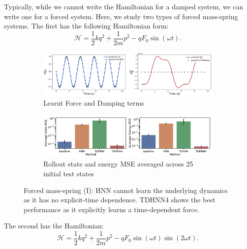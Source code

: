 \documentclass{article}
\begin{document}
Typically, while we cannot write the Hamiltonian for a damped system, we can write one for a forced system. Here, we study two types of forced mass-spring systems. The first has the following Hamiltonian form:
\begin{equation}
\mathcal{H} = \frac{1}{2}kq^2 + \frac{1}{2m}p^2 - qF_0\sin(\omega t).
\end{equation}
\begin{figure}[h!]
\centering
\captionsetup{justification=centering}
	\begin{subfigure}[b]{0.48\textwidth}
		\centering
		\includegraphics[width=\textwidth]{figures/figures/forced_mass_spring/1/forced_mass_spring_dpdt_new_0.pdf}
		\caption{Learnt Force and Damping terms}
	\end{subfigure}
	\begin{subfigure}[b]{0.48\textwidth}
	    \centering
		\includegraphics[width=\textwidth]{figures/figures/forced_mass_spring/1/forced_mass_spring_errors_0.pdf}
		\caption{Rollout state and energy MSE averaged across 25 initial test states}
	\end{subfigure}
\caption{Forced mass-spring (I): HNN cannot learn the underlying dynamics as it has no explicit-time dependence. TDHNN4 shows the best performance as it explicitly learns a time-dependent force.}
\label{fig.fmspring1}
\end{figure}
The second has the Hamiltonian:
\begin{equation}
\mathcal{H} = \frac{1}{2}kq^2 + \frac{1}{2m}p^2 - qF_0\sin(\omega t)\sin(2\omega t).
\end{equation}
\end{document}
